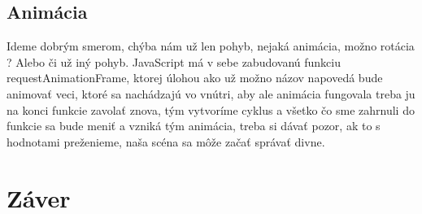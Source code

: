 \documentclass[10pt,twoside,slovak,a4paper]{article}
\begin{document}
\subsection{Animácia}

Ideme dobrým smerom, chýba nám už len pohyb, nejaká animácia, možno rotácia ? Alebo či už iný pohyb. JavaScript má v sebe zabudovanú funkciu requestAnimationFrame, ktorej úlohou ako už možno názov napovedá bude animovať veci, ktoré sa nachádzajú vo vnútri, aby ale animácia fungovala treba ju na konci funkcie zavolať znova, tým vytvoríme cyklus a všetko čo sme zahrnuli do funkcie sa bude meniť a vzniká tým animácia, treba si dávať pozor, ak to s hodnotami preženieme, naša scéna sa môže začať správať divne. 

\section{Záver}





\end{document}
